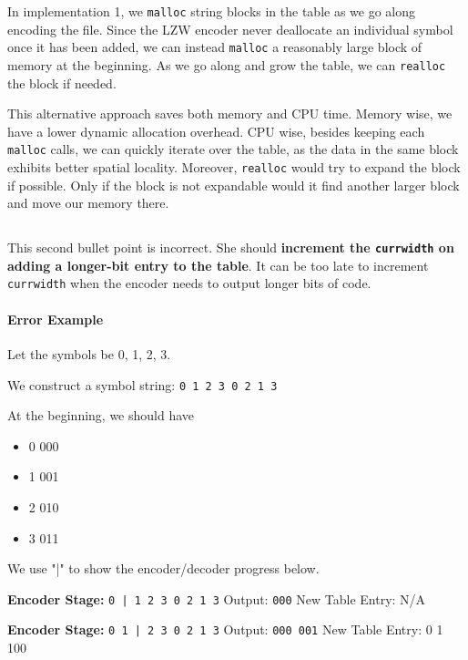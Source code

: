 \documentclass[12pt]{article}
\begin{document}
In implementation 1, we \texttt{malloc} string blocks in the table as we go along encoding the file. Since the LZW encoder never deallocate an individual symbol once it has been added, we can instead \texttt{malloc} a reasonably large block of memory at the beginning. As we go along and grow the table, we can \texttt{realloc} the block if needed.

This alternative approach saves both memory and CPU time. Memory wise, we have a lower dynamic allocation overhead. CPU wise, besides keeping each \texttt{malloc} calls, we can quickly iterate over the table, as the data in the same block exhibits better spatial locality. Moreover, \texttt{realloc} would try to expand the block if possible. Only if the block is not expandable would it find another larger block and move our memory there. 

\subsection{}

This second bullet point is incorrect. She should \textbf{increment the \texttt{currwidth} on adding a longer-bit entry to the table}. It can be too late to increment \texttt{currwidth} when the encoder needs to output longer bits of code.

\paragraph*{Error Example}

Let the symbols be 0, 1, 2, 3.

We construct a symbol string: \texttt{0 1 2 3 0 2 1 3}

At the beginning, we should have
\begin{itemize}[topsep=0pt]\itemsep-0.6em 
    \item 0 \textrightarrow{}000
    \item 1 \textrightarrow{}001
    \item 2 \textrightarrow{}010
    \item 3 \textrightarrow{}011
\end{itemize}

We use "|" to show the encoder/decoder progress below.

\textbf{Encoder Stage:} \texttt{0 | 1 2 3 0 2 1 3}
\newline Output: \texttt{000}
\newline New Table Entry: N/A

\textbf{Encoder Stage:} \texttt{0 1 | 2 3 0 2 1 3}
\newline Output: \texttt{000 001}
\newline New Table Entry: 0 1 \textrightarrow{} 100
\end{document}
